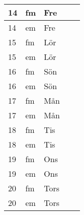 \documentclass[a4paper]{article}
\begin{document}
\begin{table}[ht!]
\begin{tabular}{lllp{7cm}p{7cm}}
\multicolumn{1}{|l|}{14} & \multicolumn{1}{l|}{fm} & \multicolumn{1}{l|}{Fre} & \multicolumn{1}{l|}{} & \multicolumn{1}{l|}{} \\ \hline
\multicolumn{1}{|l|}{14} & \multicolumn{1}{l|}{em} & \multicolumn{1}{l|}{Fre} & \multicolumn{1}{l|}{} & \multicolumn{1}{l|}{} \\ \hline    

\multicolumn{1}{|l|}{15} & \multicolumn{1}{l|}{fm} & \multicolumn{1}{l|}{Lör} & \multicolumn{1}{l|}{} & \multicolumn{1}{l|}{} \\ \hline
\multicolumn{1}{|l|}{15} & \multicolumn{1}{l|}{em} & \multicolumn{1}{l|}{Lör} & \multicolumn{1}{l|}{} & \multicolumn{1}{l|}{} \\ \hline    

\multicolumn{1}{|l|}{16} & \multicolumn{1}{l|}{fm} & \multicolumn{1}{l|}{Sön} & \multicolumn{1}{l|}{} & \multicolumn{1}{l|}{} \\ \hline
\multicolumn{1}{|l|}{16} & \multicolumn{1}{l|}{em} & \multicolumn{1}{l|}{Sön} & \multicolumn{1}{l|}{} & \multicolumn{1}{l|}{} \\ \hline    

\multicolumn{1}{|l|}{17} & \multicolumn{1}{l|}{fm} & \multicolumn{1}{l|}{Mån} & \multicolumn{1}{l|}{} & \multicolumn{1}{l|}{} \\ \hline
\multicolumn{1}{|l|}{17} & \multicolumn{1}{l|}{em} & \multicolumn{1}{l|}{Mån} & \multicolumn{1}{l|}{} & \multicolumn{1}{l|}{} \\ \hline    

\multicolumn{1}{|l|}{18} & \multicolumn{1}{l|}{fm} & \multicolumn{1}{l|}{Tis} & \multicolumn{1}{l|}{} & \multicolumn{1}{l|}{} \\ \hline
\multicolumn{1}{|l|}{18} & \multicolumn{1}{l|}{em} & \multicolumn{1}{l|}{Tis} & \multicolumn{1}{l|}{} & \multicolumn{1}{l|}{} \\ \hline    

\multicolumn{1}{|l|}{19} & \multicolumn{1}{l|}{fm} & \multicolumn{1}{l|}{Ons} & \multicolumn{1}{l|}{} & \multicolumn{1}{l|}{} \\ \hline
\multicolumn{1}{|l|}{19} & \multicolumn{1}{l|}{em} & \multicolumn{1}{l|}{Ons} & \multicolumn{1}{l|}{} & \multicolumn{1}{l|}{} \\ \hline    

\multicolumn{1}{|l|}{20} & \multicolumn{1}{l|}{fm} & \multicolumn{1}{l|}{Tors} & \multicolumn{1}{l|}{} & \multicolumn{1}{l|}{} \\ \hline
\multicolumn{1}{|l|}{20} & \multicolumn{1}{l|}{em} & \multicolumn{1}{l|}{Tors} & \multicolumn{1}{l|}{} & \multicolumn{1}{l|}{} \\ \hline    


\end{tabular}
\end{table}
\end{document}
